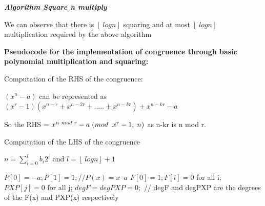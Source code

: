 \documentclass[a4paper,12pt]{article}
\begin{document}
\vspace{0.1in}
\begin{flushleft}
	\textbf{\textit{Algorithm Square n multiply}}
\end{flushleft}

We can observe that there is \(\left\lfloor\ logn \right\rfloor\) squaring and at most \(\left\lfloor\ logn \right\rfloor\) multiplication required by the above algorithm

\begin{flushleft}
	\textbf{Pseudocode for the implementation of congruence through basic polynomial
multiplication and squaring:}
\end{flushleft}

\begin{flushleft}
	Computation of the RHS of the congruence:
\end{flushleft}
\((x^n-a)\) can be represented as \((x^r - 1)(x^{n-r} + x^{n-2r} +.....+ x^{n-kr}) + x^{n-kr} - a\)

\begin{flushleft}
	So the RHS = \(x^{n \hspace{0.1cm} mod \hspace{0.1cm} r} - a \hspace{0.1cm} (mod \hspace{0.2cm} x^r -1,\hspace{0.1cm} n)\) as n-kr is n mod r.
\end{flushleft}

\begin{flushleft}
	Computation of the LHS of the congruence
\end{flushleft}

 \begin{flushleft}
 	\(n=\sum_{i=0}^{l}b_{i}2^i\) and \(l = \left\lfloor\ logn \right\rfloor +1 \)
 \end{flushleft}
 
\begin{flushleft}
	\(P[0]=-a ; P[1]=1 ; // P(x) = x – a \)
	\vspace{0.1in}
\newline
\(F[0] = 1 ; F[i] = 0 \) for all i;
\vspace{0.1in}
\newline
\(PXP [j] = 0 \) for all j;
\vspace{0.1in}
\newline
\(degF = degPXP = 0;\)
\vspace{0.05in}
\newline
 // degF and degPXP are the degrees of the F(x) and PXP(x) respectively
\end{flushleft}
\end{document}

